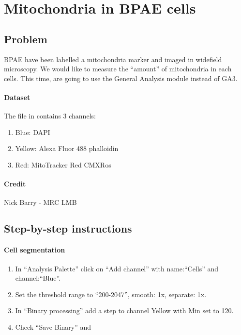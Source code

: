 \section{Mitochondria in BPAE cells} \label{sec:bpae-mitochondria}

\subsection*{Problem}
BPAE have been labelled a mitochondria marker and imaged in widefield microscopy. We would like to measure the ``amount'' of mitochondria in each cells. This time, are going to use the General Analysis module instead of GA3.

\paragraph{Dataset} The file in  contains 3 channels:
\begin{enumerate}
    \item Blue: DAPI
    \item Yellow: Alexa Fluor 488 phalloidin
    \item Red: MitoTracker Red CMXRos
\end{enumerate}

\paragraph{Credit} Nick Barry - MRC LMB

\subsection*{Step-by-step instructions}
\paragraph{Cell segmentation}
\begin{enumerate}
    \item In ``Analysis Palette'' click on ``Add channel'' with name:``Cells'' and channel:``Blue''.
    \item Set the threshold range to ``200-2047'', smooth: 1x, separate: 1x.
    \item In ``Binary processing'' add a step  to channel Yellow with Min set to 120.
    \item Check ``Save Binary'' and 
\end{enumerate}

